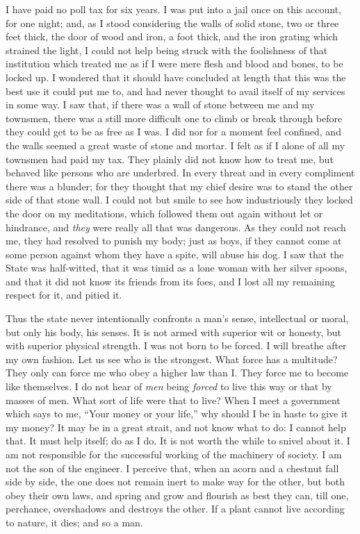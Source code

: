 \documentclass[12pt]{article}
\begin{document}
I have paid no poll tax for six years. I was put into a jail once on
this account, for one night; and, as I stood considering the walls of
solid stone, two or three feet thick, the door of wood and iron, a foot
thick, and the iron grating which strained the light, I could not help
being struck with the foolishness of that institution which treated me
as if I were mere flesh and blood and bones, to be locked up. I wondered
that it should have concluded at length that this was the best use it
could put me to, and had never thought to avail itself of my services in
some way. I saw that, if there was a wall of stone between me and my
townsmen, there was a still more difficult one to climb or break through
before they could get to be as free as I was. I did nor for a moment
feel confined, and the walls seemed a great waste of stone and mortar. I
felt as if I alone of all my townsmen had paid my tax. They plainly did
not know how to treat me, but behaved like persons who are underbred. In
every threat and in every compliment there was a blunder; for they
thought that my chief desire was to stand the other side of that stone
wall. I could not but smile to see how industriously they locked the
door on my meditations, which followed them out again without let or
hindrance, and \emph{they} were really all that was dangerous. As they
could not reach me, they had resolved to punish my body; just as boys,
if they cannot come at some person against whom they have a spite, will
abuse his dog. I saw that the State was half-witted, that it was timid
as a lone woman with her silver spoons, and that it did not know its
friends from its foes, and I lost all my remaining respect for it, and
pitied it.

Thus the state never intentionally confronts a man's sense, intellectual
or moral, but only his body, his senses. It is not armed with superior
wit or honesty, but with superior physical strength. I was not born to
be forced. I will breathe after my own fashion. Let us see who is the
strongest. What force has a multitude? They only can force me who obey a
higher law than I. They force me to become like themselves. I do not
hear of \emph{men} being \emph{forced} to live this way or that by
masses of men. What sort of life were that to live? When I meet a
government which says to me, ``Your money or your life,'' why should I
be in haste to give it my money? It may be in a great strait, and not
know what to do: I cannot help that. It must help itself; do as I do. It
is not worth the while to snivel about it. I am not responsible for the
successful working of the machinery of society. I am not the son of the
engineer. I perceive that, when an acorn and a chestnut fall side by
side, the one does not remain inert to make way for the other, but both
obey their own laws, and spring and grow and flourish as best they can,
till one, perchance, overshadows and destroys the other. If a plant
cannot live according to nature, it dies; and so a man.
\end{document}
